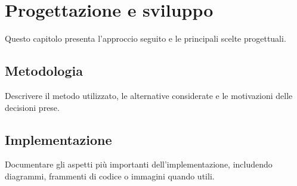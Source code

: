 \chapter{Progettazione e sviluppo}
\label{chap:development}

Questo capitolo presenta l'approccio seguito e le principali scelte
progettuali.

\section{Metodologia}

Descrivere il metodo utilizzato, le alternative considerate e le motivazioni
delle decisioni prese.

\section{Implementazione}

Documentare gli aspetti più importanti dell'implementazione, includendo
diagrammi, frammenti di codice o immagini quando utili.
